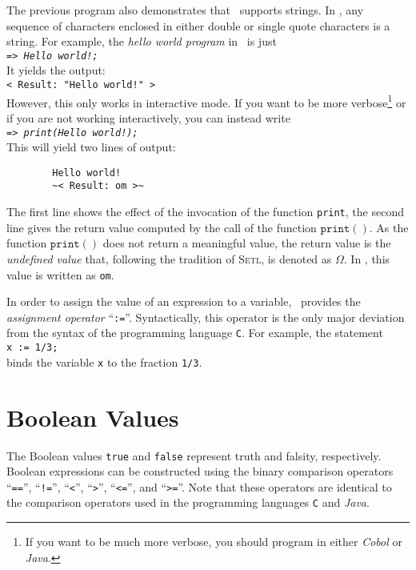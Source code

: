 \noindent
The previous program also demonstrates that \setlx\ supports strings.  In \setlx, any sequence of
characters enclosed in either double or single quote characters is a string.  For example, the 
\emph{hello world program} in \setlx\ is just 
\\[0.2cm]
\hspace*{1.3cm}
\texttt{=> \textsl{Hello world!;}}
\\[0.2cm]
It yields the output:
\\[0.2cm]
\hspace*{1.3cm}
\texttt{< Result: "Hello world!" >}
\texttt{}
\\[0.2cm]
However, this only works in interactive mode.  If you want to be more verbose\footnote{
If you want to be much more verbose, you should program in either \textsl{Cobol} or \textsl{Java}.
} or if you are not working interactively, you can instead write
\\[0.2cm]
\hspace*{1.3cm}
\texttt{=> \textsl{print(Hello world!);}}
\\[0.2cm]
This will yield two lines of  output:
\begin{verbatim}
        Hello world!
        ~< Result: om >~
\end{verbatim}
The first line shows the effect of the invocation of the function \texttt{print}, the
second line gives the return value computed by the call of the function $\texttt{print}()$.  As the
function $\texttt{print}()$ does not return a meaningful value, the
return value is the \emph{undefined value} that, following the
tradition of \textsc{Setl}, is denoted as $\Omega$.  In \setlx, this value is written as \texttt{om}.


In order to assign the value of an expression to a variable, \setlx\ provides the 
\emph{assignment operator} ``\texttt{:=}''.  Syntactically, this operator is the only major deviation from the syntax 
of the programming language \texttt{C}. For example, the statement
\\[0.2cm]
\hspace*{1.3cm}
\texttt{x := 1/3;}
\\[0.2cm]
binds the variable \texttt{x} to the fraction \texttt{1/3}.  
\vspace*{0.3cm}


\section{Boolean Values}
The Boolean values \texttt{true} and \texttt{false} represent truth and falsity, respectively.  Boolean
expressions can be constructed using the binary comparison operators ``\texttt{==}'', 
``\texttt{!=}'', ``\texttt{<}'',  ``\texttt{>}'', ``\texttt{<=}'', and ``\texttt{>=}''.
Note that these operators are identical to the comparison operators used in the programming languages
\texttt{C} and \textsl{Java}.

